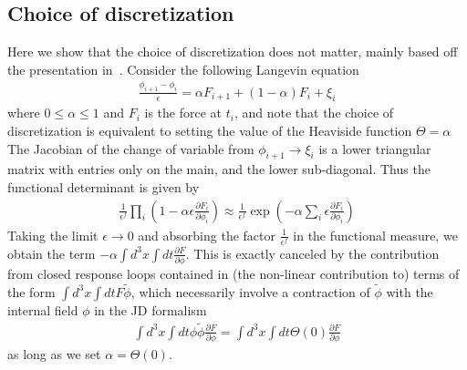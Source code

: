 \documentclass[aps,preprintnumbers,superscriptaddress,longbibliography]{revtex4-1}
\begin{document}
\subsection{Choice of discretization}
\label{discretization}
Here we show that the choice of discretization does not matter, mainly based off the presentation in~\cite{CriticalDynamics}. Consider the following Langevin equation
\begin{align}
    \frac{\phi_{i+1}-\phi_{i}}{\epsilon}=\alpha F_{i+1}+(1-\alpha)F_{i}+\xi_i
\end{align}
where $0\leq \alpha \leq1 $ and $F_i$ is the force at $t_i$, and note that the choice of discretization is equivalent to setting the value of the Heaviside function $\Theta=\alpha$ The Jacobian of the change of variable from $\phi_{i+1}\rightarrow\xi_i$ is a lower triangular matrix with entries only on the main, and the lower sub-diagonal. Thus the functional determinant is given by
\begin{align}
    \frac{1}{\epsilon^f} \prod_i(1-\alpha\epsilon\frac{\partial F_i}{\partial \phi_{i}})\approx\frac{1}{\epsilon^f}\exp(-\alpha\sum_i\epsilon\frac{\partial F_i}{\partial \phi_{i}})
\end{align} 
Taking the limit $\epsilon\rightarrow0$ and absorbing the factor $\frac{1}{\epsilon^f}$ in the functional measure, we obtain the term $-\alpha\int d^3x\int dt\frac{\partial F}{\partial \phi}$. This is exactly canceled by the contribution from closed response loops contained in (the non-linear contribution to) terms of the form $\int d^3x\int dt F\tilde{\phi} $, which necessarily involve a contraction of $\tilde{\phi}$ with the internal field $\phi$ in the JD formalism 
\begin{align}
    \int d^3x\int dt \phi\tilde{\phi}\frac{\partial F}{\partial \phi}=\int d^3x\int dt \Theta(0)\frac{\partial F}{\partial \phi}
\end{align}
as long as we set $\alpha=\Theta(0)$.  
\end{document}
